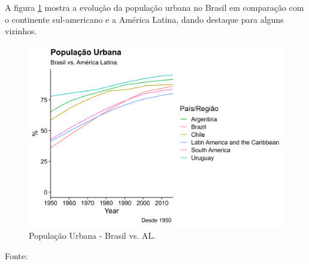 \documentclass[
	12pt,				%
	oneside,			%
	a4paper,			%
	chapter=TITLE,		%
	section=TITLE,		%
	english,			%
	brazil				%
	]{abntex2}
\newcommand{\bcenter}{\begin{center}}
\newcommand{\ecenter}{\end{center}}
\begin{document}
A figura \ref{fig:pop-urb-brazil-latinAmerica} mostra a evolução da
população urbana no Brasil em comparação com o continente sul-americano
e a América Latina, dando destaque para alguns vizinhos.
\begin{figure}[H]

{\centering \includegraphics[width=0.8\linewidth]{images/pop-urb-brazil-latinAmerica-1} 

}

\caption{População Urbana - Brasil vs. AL.}\label{fig:pop-urb-brazil-latinAmerica}
\end{figure}
\bcenter
Fonte: \textcite{doi:10.1177/0959683609356587} \ecenter
\end{document}
